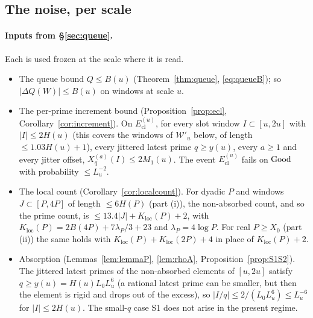 \subsection{The noise, per scale}\label{sec:noise-perscale}

\paragraph{Inputs from \S\ref{sec:queue}.} Each is used frozen at the scale where it is read.
\begin{itemize}
\item The queue bound $Q\le B(u)$ (Theorem~\ref{thm:queue}, \eqref{eq:queueB}); so $|\Delta Q(W)|\le B(u)$ on windows at
  scale $u$.
\item The per-prime increment bound (Proposition~\ref{prop:ecl}, Corollary~\ref{cor:increment}). On $E_{\mathrm{cl}}^{(u)}$,
  for every slot window $I\subset[u,2u]$ with $|I|\le2H(u)$ (this covers the windows of $\mathcal W'_u$ below, of length
  $\le1.03H(u)+1$), every jittered latest prime $q\ge y(u)$, every $a\ge1$ and every jitter offset,
  $X_q^{(a)}(I)\le2M_1(u)$. The event $E_{\mathrm{cl}}^{(u)}$ fails on $\mathrm{Good}$ with probability
  $\le L_u^{-2}$.
\item The local count (Corollary~\ref{cor:localcount}). For dyadic $P$ and windows $J\subset[P,4P]$ of length $\le6H(P)$
  (part (i)), the non-absorbed count, and so the prime count, is $\le13.4|J|+K_{\mathrm{loc}}(P)+2$, with
  $K_{\mathrm{loc}}(P)=2B(4P)+7\lambda_P/3+23$ and $\lambda_P=4\log P$. For real $P\ge X_0$ (part (ii)) the same holds with
  $K_{\mathrm{loc}}(P)+K_{\mathrm{loc}}(2P)+4$ in place of $K_{\mathrm{loc}}(P)+2$.
\item Absorption (Lemmas~\ref{lem:lemmaP}, \ref{lem:rhoA}, Proposition~\ref{prop:S1S2}). The jittered latest primes of the
  non-absorbed elements of $[u,2u]$ satisfy $q\ge y(u)=H(u)L_0L_u^6$ (a rational latest prime can be smaller, but then the
  element is rigid and drops out of the excess), so $|I/q|\le2/(L_0L_u^6)\le L_u^{-6}$ for $|I|\le2H(u)$. The small-$q$ case S1
  does not arise in the present regime.
\end{itemize}

